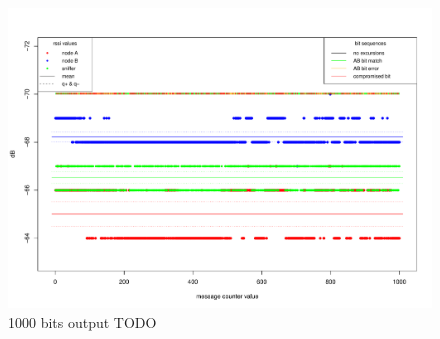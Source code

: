 \documentclass[
  print, %
  Table,   %
  nolof,     %
  nolot,     %
           oneside
]{fithesis3}
\begin{document}
\begin{figure}
  \includegraphics[height=\textwidth, angle = 90 ]{../images/graph_rssi_03.pdf}
\caption{1000 bits output TODO}
\label{fig:rssi_03}
\end{figure}
\end{document}
